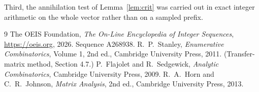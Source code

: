 \documentclass[11pt,a4paper]{article}
\theoremstyle{plain}
\theoremstyle{definition}
\begin{document}
Third, the annihilation test of Lemma~\ref{lem:crit} was carried out in exact integer
arithmetic on the whole vector rather than on a sampled prefix.

\begin{thebibliography}{9}
 The OEIS Foundation, \emph{The On-Line Encyclopedia of Integer
Sequences}, \url{https://oeis.org}, 2026. Sequence A268938.
 R.~P.~Stanley, \emph{Enumerative Combinatorics}, Volume 1, 2nd ed.,
Cambridge University Press, 2011. (Transfer-matrix method, Section 4.7.)
 P.~Flajolet and R.~Sedgewick, \emph{Analytic Combinatorics}, Cambridge
University Press, 2009.
 R.~A.~Horn and C.~R.~Johnson, \emph{Matrix Analysis}, 2nd ed., Cambridge
University Press, 2013.
\end{thebibliography}
\end{document}
